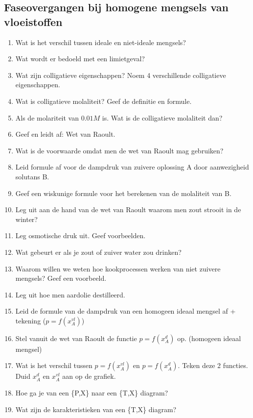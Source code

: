 \documentclass[a4paper,12pt]{article}
\begin{document}
    \subsection*{Faseovergangen bij homogene mengsels van vloeistoffen}
    \begin{enumerate}
        \item Wat is het verschil tussen ideale en niet-ideale mengsels?
        \item Wat wordt er bedoeld met een limietgeval?
        \item Wat zijn colligatieve eigenschappen? Noem 4 verschillende colligatieve eigenschappen.
        \item Wat is colligatieve molaliteit? Geef de definitie en formule.
        \item Als de molariteit van  $0.01M$ is. Wat is de colligatieve molaliteit dan?
        \item Geef en leidt af: Wet van Raoult.
        \item Wat is de voorwaarde omdat men de wet van Raoult mag gebruiken?
        \item Leid formule af voor de dampdruk van zuivere oplossing A door aanwezigheid solutans B.
        \item Geef een wiskunige formule voor het berekenen van de molaliteit van B.
        \item Leg uit aan de hand van de wet van Raoult waarom men zout strooit in de winter?
        \item Leg osmotische druk uit. Geef voorbeelden.
        \item Wat gebeurt er als je zout of zuiver water zou drinken?
        \item Waarom willen we weten hoe kookprocessen werken van niet zuivere mengsels? Geef een voorbeeld.
        \item Leg uit hoe men aardolie destilleerd.
        \item Leid de formule van de dampdruk van een homogeen ideaal mengsel af + tekening ($p=f(x^{vl}_A)$)
        \item Stel vanuit de wet van Raoult de functie $ p = f(x_A^d) $ op. (homogeen ideaal mengsel)
        \item Wat is het verschil tussen $p=f(x^{vl}_A)$ en $ p = f(x_A^d) $. Teken deze 2 functies. Duid $x_A^d$ en $x^{vl}_A$ aan op de grafiek.
        \item Hoe ga je van een \{P,X\} naar een \{T,X\} diagram?
        \item Wat zijn de karakteristieken van een \{T,X\} diagram?

\end{enumerate}
\end{document}
